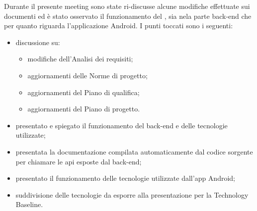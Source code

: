 Durante il presente meeting sono state ri-discusse alcune modifiche effettuate sui documenti ed è stato osservato il funzionamento del , sia nela parte back-end che per quanto riguarda l'applicazione Android.
I punti toccati sono i seguenti:
\begin{itemize}
\item discussione su:
   \begin{itemize}
      \item modifiche dell'Analisi dei requisiti;
      \item aggiornamenti delle Norme di progetto;
      \item aggiornamenti del Piano di qualifica;
      \item aggiornamenti del Piano di progetto.
   \end{itemize}
\item presentato e spiegato il funzionamento del back-end e delle tecnologie utilizzate;
\item presentata la documentazione compilata automaticamente dal codice sorgente per chiamare le api  esposte dal back-end;
\item presentato il funzionamento delle tecnologie utilizzate dall'app Android;
\item suddivisione delle tecnologie da esporre alla presentazione per la Technology Baseline.
\end{itemize}

